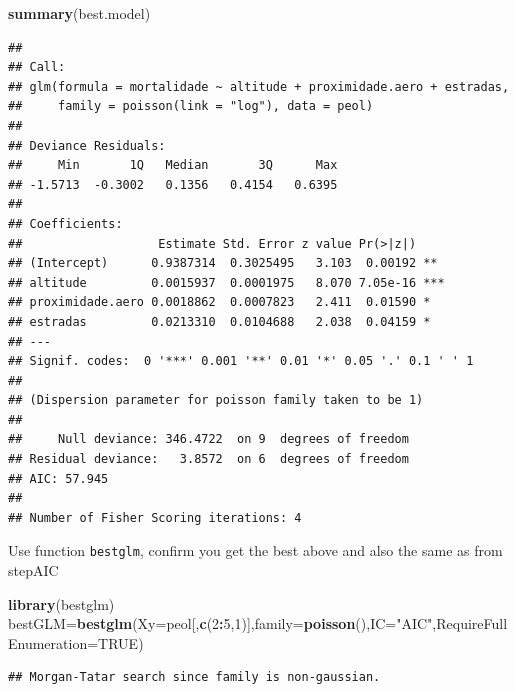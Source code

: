 \documentclass[
]{book}
\newenvironment{Shaded}{\begin{snugshade}}{\end{snugshade}}
\newcommand{\DataTypeTok}[1]{\textcolor[rgb]{0.13,0.29,0.53}{#1}}
\newcommand{\DecValTok}[1]{\textcolor[rgb]{0.00,0.00,0.81}{#1}}
\newcommand{\KeywordTok}[1]{\textcolor[rgb]{0.13,0.29,0.53}{\textbf{#1}}}
\newcommand{\NormalTok}[1]{#1}
\newcommand{\OperatorTok}[1]{\textcolor[rgb]{0.81,0.36,0.00}{\textbf{#1}}}
\newcommand{\OtherTok}[1]{\textcolor[rgb]{0.56,0.35,0.01}{#1}}
\newcommand{\StringTok}[1]{\textcolor[rgb]{0.31,0.60,0.02}{#1}}
\begin{document}
\begin{Shaded}
\begin{Highlighting}[]
\KeywordTok{summary}\NormalTok{(best.model)}
\end{Highlighting}
\end{Shaded}

\begin{verbatim}
## 
## Call:
## glm(formula = mortalidade ~ altitude + proximidade.aero + estradas, 
##     family = poisson(link = "log"), data = peol)
## 
## Deviance Residuals: 
##     Min       1Q   Median       3Q      Max  
## -1.5713  -0.3002   0.1356   0.4154   0.6395  
## 
## Coefficients:
##                   Estimate Std. Error z value Pr(>|z|)    
## (Intercept)      0.9387314  0.3025495   3.103  0.00192 ** 
## altitude         0.0015937  0.0001975   8.070 7.05e-16 ***
## proximidade.aero 0.0018862  0.0007823   2.411  0.01590 *  
## estradas         0.0213310  0.0104688   2.038  0.04159 *  
## ---
## Signif. codes:  0 '***' 0.001 '**' 0.01 '*' 0.05 '.' 0.1 ' ' 1
## 
## (Dispersion parameter for poisson family taken to be 1)
## 
##     Null deviance: 346.4722  on 9  degrees of freedom
## Residual deviance:   3.8572  on 6  degrees of freedom
## AIC: 57.945
## 
## Number of Fisher Scoring iterations: 4
\end{verbatim}

Use function \texttt{bestglm}, confirm you get the best above and also the same as from stepAIC

\begin{Shaded}
\begin{Highlighting}[]
\KeywordTok{library}\NormalTok{(bestglm)}
\NormalTok{bestGLM=}\KeywordTok{bestglm}\NormalTok{(}\DataTypeTok{Xy=}\NormalTok{peol[,}\KeywordTok{c}\NormalTok{(}\DecValTok{2}\OperatorTok{:}\DecValTok{5}\NormalTok{,}\DecValTok{1}\NormalTok{)],}\DataTypeTok{family=}\KeywordTok{poisson}\NormalTok{(),}\DataTypeTok{IC=}\StringTok{"AIC"}\NormalTok{,}\DataTypeTok{RequireFullEnumeration=}\OtherTok{TRUE}\NormalTok{)}
\end{Highlighting}
\end{Shaded}

\begin{verbatim}
## Morgan-Tatar search since family is non-gaussian.
\end{verbatim}

\begin{Shaded}
\end{Shaded}
\end{document}
